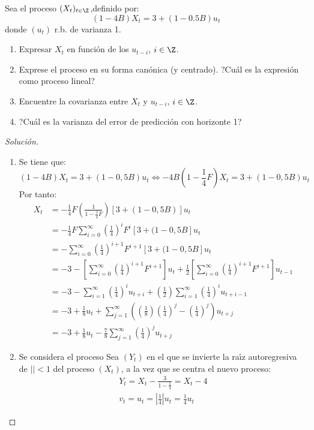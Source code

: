 \begin{ejemplo}
Sea el proceso $(X_{{t}})_{t\in \Z} $,definido por:
\[
(1-4B)X_{t} =3+(1-0.5B)u_{t} 
\]
donde $(u_{t})$ r.b. de varianza 1.
\begin{enumerate}
\item Expresar $X_{t}$ en funci\'{o}n de los $u_{t-i}$, $i\in \Z$.
\item Exprese el proceso en su forma can\'{o}nica (y centrado). ?Cu\'{a}l es la expresi\'{o}n como proceso lineal?
\item Encuentre la covarianza entre $X_{t}$ y $u_{t-i}$, $i\in \Z$.
\item ?Cu\'{a}l es la varianza del error de predicci\'{o}n con horizonte 1?
\end{enumerate}


\begin{proof}[Soluci\'{o}n]
\begin{enumerate}
\item Se tiene que:
\[
(1-4B)X_t=3+(1-0,5B)u_t\Longleftrightarrow -4B(1-\frac{1}{4}F)X_{t} 
=3+(1-0,5B)u_{t} 
\]
Por tanto: 
\begin{align*}
X_{t} 
	&=-\frac{1}{4}F\left( {\frac{1}{1-\frac{1}{4}F}} \right)\left[{3+(1-0,5B)} \right]u_{t}\\
	&=-\frac{1}{4}F\sum_{i=0}^\infty {\left({\frac{1}{4}} \right)^{i}F^{i}\left[ {3+(1-0,5B} \right]} u_{t} \\ 
	&=-\sum_{i=0}^\infty {\left( {\frac{1}{4}} \right)^{i+1}F^{i+1}\left[ {3+(1-0,5B} \right]u_{t} }\\
	&=-3-\left[{\sum_{i=0}^\infty {\left( {\frac{1}{4}} \right)^{i+1}F^{i+1}} } \right]u_{t} +\frac{1}{2}\left[ {\sum_{i=0}^\infty {\left( {\frac{1}{4}} \right)^{i+1}F^{i+1}} } \right]u_{t-1} \\ 
	&=-3-\sum_{i=1}^\infty {\left( {\frac{1}{4}} \right)^{i}u_{t+i} +\left( {\frac{1}{2}} \right)\sum_{i=1}^\infty {\left( {\frac{1}{4}} \right)^{i}u_{t+i-1} } }\\ &=-3+\frac{1}{8}u_{t} +\sum_{j=1}^\infty {\left( {\left( {\frac{1}{8}} \right)\left( {\frac{1}{4}} \right)^{j}-\left( {\frac{1}{4}} \right)^{j}} \right)u_{t+j} } \\ 
	&=-3+\frac{1}{8}u_{t} -\frac{7}{8}\sum_{j=1}^\infty {\left( {\frac{1}{4}} \right)^{j}u_{t+j} } 
\end{align*}

\item Se considera el proceso Sea $(Y_{t} )$ en el que se invierte la ra\'{\i}z autoregresiva de $\left| \right|< 1$ del proceso $(X_{t} )$, a la vez que se centra el nuevo proceso:
\begin{gather*}
  Y_{t} =X_{t} -\frac{3}{1-\frac{1}{4}}=X_{t} -4 \\
  v_{t} =u_{t} =\left| {\frac{1}{4}} \right|u_{t} =\frac{1}{4}u_{t}
\end{gather*}


\end{enumerate}
\end{proof}
\end{ejemplo}

